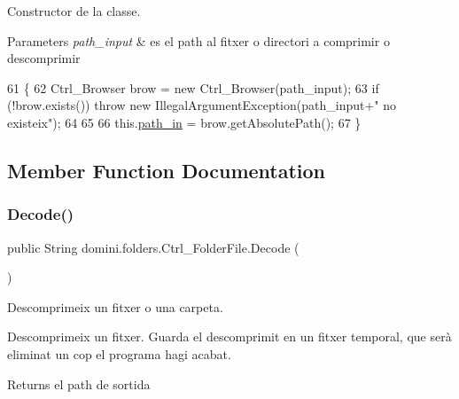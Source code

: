 Constructor de la classe. 


\begin{DoxyParams}{Parameters}
{\em path\+\_\+input} & es el path al fitxer o directori a comprimir o descomprimir \\
\hline
\end{DoxyParams}

\begin{DoxyCode}
61                                               \{
62         Ctrl\_Browser brow = \textcolor{keyword}{new} Ctrl\_Browser(path\_input);
63         \textcolor{keywordflow}{if} (!brow.exists()) \textcolor{keywordflow}{throw} \textcolor{keyword}{new} IllegalArgumentException(path\_input+\textcolor{stringliteral}{" no existeix"});
64 
65 
66         this.\hyperlink{classdomini_1_1folders_1_1Ctrl__FolderFile_a0d3946bb2832a1f34d0c2227df5c71c4}{path\_in} = brow.getAbsolutePath();
67     \}
\end{DoxyCode}


\subsection{Member Function Documentation}
\mbox{\label{classdomini_1_1folders_1_1Ctrl__FolderFile_a5d28ac7f5223ecd40a242148e86447c1}} 
\subsubsection{\texorpdfstring{Decode()}{Decode()}\hspace{0.1cm}{\footnotesize\ttfamily [1/2]}}
{\footnotesize\ttfamily public String domini.\+folders.\+Ctrl\+\_\+\+Folder\+File.\+Decode (\begin{DoxyParamCaption}{ }\end{DoxyParamCaption})\hspace{0.3cm}{\ttfamily [inline]}}



Descomprimeix un fitxer o una carpeta. 

Descomprimeix un fitxer. Guarda el descomprimit en un fitxer temporal, que serà eliminat un cop el programa hagi acabat.

\begin{DoxyReturn}{Returns}
el path de sortida 
\end{DoxyReturn}


